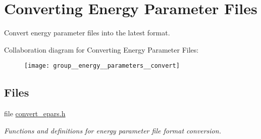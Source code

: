 \hypertarget{group__energy__parameters__convert}{}\section{Converting Energy Parameter Files}
\label{group__energy__parameters__convert}


Convert energy parameter files into the latest format.  


Collaboration diagram for Converting Energy Parameter Files\+:
\nopagebreak
\begin{figure}[H]
\begin{center}
\leavevmode
\texttt{[image: group\_\_energy\_\_parameters\_\_convert]}
\end{center}
\end{figure}
\subsection*{Files}
\begin{DoxyCompactItemize}
\item 
file \hyperlink{convert__epars_8h}{convert\+\_\+epars.\+h}
\begin{DoxyCompactList}\small\item\em Functions and definitions for energy parameter file format conversion. \end{DoxyCompactList}\end{DoxyCompactItemize}
